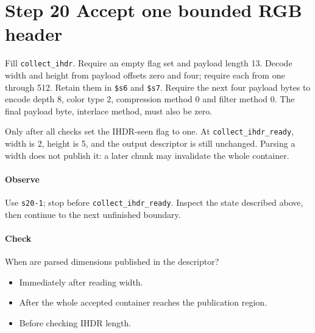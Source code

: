 \section{Step 20 Accept one bounded RGB header}\label{png-collect-s20}
Fill \texttt{collect\_ihdr}. Require an empty flag set and payload length 13. Decode width and height from payload offsets zero and four; require each from one through 512. Retain them in \texttt{\$s6} and \texttt{\$s7}. Require the next four payload bytes to encode depth 8, color type 2, compression method 0 and filter method 0. The final payload byte, interlace method, must also be zero.

Only after all checks set the IHDR-seen flag to one. At \texttt{collect\_ihdr\_ready}, width is 2, height is 5, and the output descriptor is still unchanged. Parsing a width does not publish it: a later chunk may invalidate the whole container.

\paragraph{Observe} Use \texttt{s20-1}; stop before \texttt{collect\_ihdr\_ready}. Inspect the state described above, then continue to the next unfinished boundary.

\paragraph{Check} When are parsed dimensions published in the descriptor?
\begin{itemize}
  \item[A.] Immediately after reading width.
  \item[B.] After the whole accepted container reaches the publication region.
  \item[C.] Before checking IHDR length.
\end{itemize}
